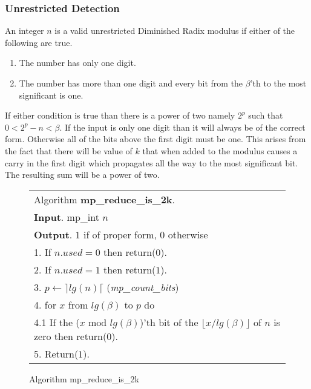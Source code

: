 \documentclass[b5paper]{book}
\begin{document}
\subsubsection{Unrestricted Detection}
An integer $n$ is a valid unrestricted Diminished Radix modulus if either of the following are true.

\begin{enumerate}
\item  The number has only one digit.
\item  The number has more than one digit and every bit from the $\beta$'th to the most significant is one.
\end{enumerate}

If either condition is true than there is a power of two namely $2^p$ such that $0 < 2^p - n < \beta$.   If the input is only
one digit than it will always be of the correct form.  Otherwise all of the bits above the first digit must be one.  This arises from the fact
that there will be value of $k$ that when added to the modulus causes a carry in the first digit which propagates all the way to the most
significant bit.  The resulting sum will be a power of two.

\begin{figure}[!here]
\begin{small}
\begin{center}
\begin{tabular}{l}
\hline Algorithm \textbf{mp\_reduce\_is\_2k}. \\
\textbf{Input}.   mp\_int $n$   \\
\textbf{Output}.  $1$ if of proper form, $0$ otherwise \\
\hline
1.  If $n.used = 0$ then return($0$). \\
2.  If $n.used = 1$ then return($1$). \\
3.  $p \leftarrow \rceil lg(n) \lceil$  (\textit{mp\_count\_bits}) \\
4.  for $x$ from $lg(\beta)$ to $p$ do \\
\hspace{3mm}4.1  If the ($x \mbox{ mod }lg(\beta)$)'th bit of the $\lfloor x / lg(\beta) \rfloor$ of $n$ is zero then return($0$). \\
5.  Return($1$). \\
\hline
\end{tabular}
\end{center}
\end{small}
\caption{Algorithm mp\_reduce\_is\_2k}
\end{figure}
\end{document}
